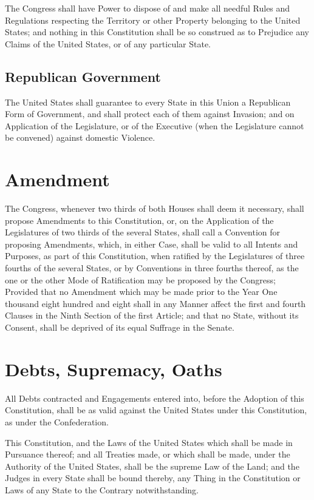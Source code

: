 \documentclass{constitution}
\begin{document}
The Congress shall have Power to dispose of and make all needful Rules and Regulations
respecting the Territory or other Property belonging to the United States;
and nothing in this Constitution shall be so construed
as to Prejudice any Claims of the United States, or of any particular State.

\section{Republican Government}
The United States shall guarantee to every State in this Union
a Republican Form of Government,
and shall protect each of them against Invasion;
and on Application of the Legislature,
or of the Executive (when the Legislature cannot be convened)
against domestic Violence.

\chapter{Amendment}
The Congress, whenever two thirds of both Houses shall deem it necessary,
shall propose Amendments to this Constitution,
or, on the Application of the Legislatures of two thirds of the several States,
shall call a Convention for proposing Amendments,
which, in either Case, shall be valid to all Intents and Purposes, as part of this Constitution,
when ratified by the Legislatures of three fourths of the several States,
or by Conventions in three fourths thereof,
as the one or the other Mode of Ratification may be proposed by the Congress;
Provided that no Amendment which may be made
prior to the Year One thousand eight hundred and eight
shall in any Manner affect the first and fourth Clauses in the Ninth Section of the first Article;
and that no State, without its Consent, shall be deprived of its equal Suffrage in the Senate.

\chapter{Debts, Supremacy, Oaths}
All Debts contracted and Engagements entered into, before the Adoption of this Constitution,
shall be as valid against the United States under this Constitution, as under the Confederation.

This Constitution, and the Laws of the United States which shall be made in Pursuance thereof;
and all Treaties made, or which shall be made, under the Authority of the United States,
shall be the supreme Law of the Land;
and the Judges in every State shall be bound thereby,
any Thing in the Constitution or Laws of any State to the Contrary notwithstanding.
\end{document}
